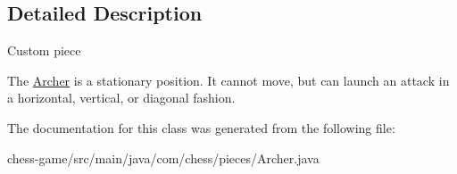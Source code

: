 \subsection{Detailed Description}
Custom piece

The \mbox{\hyperlink{classcom_1_1chess_1_1pieces_1_1_archer}{Archer}} is a stationary position. It cannot move, but can launch an attack in a horizontal, vertical, or diagonal fashion. 

The documentation for this class was generated from the following file\+:\begin{DoxyCompactItemize}
\item 
chess-\/game/src/main/java/com/chess/pieces/Archer.\+java\end{DoxyCompactItemize}
